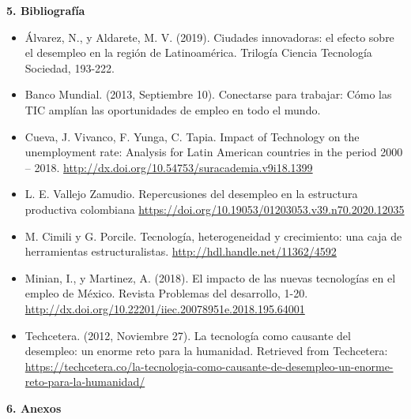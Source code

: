 \textbf{5. Bibliografía}\\
\begin{itemize}
    \item Álvarez, N., y Aldarete, M. V. (2019). Ciudades innovadoras: el efecto sobre el desempleo en la región de Latinoamérica. Trilogía Ciencia Tecnología Sociedad, 193-222.
    \item Banco Mundial. (2013, Septiembre 10). Conectarse para trabajar: Cómo las TIC amplían las oportunidades de empleo en todo el mundo.
    \item Cueva, J. Vivanco, F. Yunga, C. Tapia. Impact of Technology on the unemployment rate: Analysis for Latin American countries in the period 2000 – 2018. \url{http://dx.doi.org/10.54753/suracademia.v9i18.1399}
    \item L. E. Vallejo Zamudio. Repercusiones del desempleo en la estructura productiva colombiana \url{https://doi.org/10.19053/01203053.v39.n70.2020.12035}
    \item M. Cimili y G. Porcile. Tecnología, heterogeneidad y crecimiento: una caja de herramientas estructuralistas. \url{http://hdl.handle.net/11362/4592}
    \item Minian, I., y Martinez, A. (2018). El impacto de las nuevas tecnologías en el empleo de México. Revista Problemas del desarrollo, 1-20.  \url{http://dx.doi.org/10.22201/iiec.20078951e.2018.195.64001}
    \item Techcetera. (2012, Noviembre 27). La tecnología como causante del desempleo: un enorme reto para la humanidad. Retrieved from Techcetera: \url{https://techcetera.co/la-tecnologia-como-causante-de-desempleo-un-enorme-reto-para-la-humanidad/}
\end{itemize}


\textbf{6. Anexos}\\

